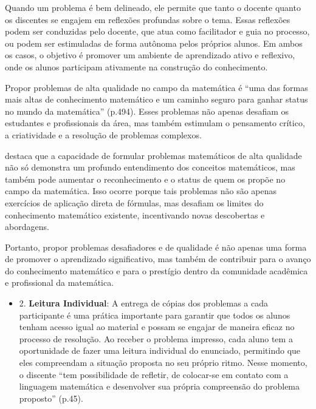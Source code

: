 Quando um problema é bem delineado, ele permite que tanto o docente quanto os discentes se engajem em reflexões profundas sobre o tema. Essas reflexões podem ser conduzidas pelo docente, que atua como facilitador e guia no processo, ou podem ser estimuladas de forma autônoma pelos próprios alunos. Em ambos os casos, o objetivo é promover um ambiente de aprendizado ativo e reflexivo, onde os alunos participam ativamente na construção do conhecimento.

Propor problemas de alta qualidade no campo da matemática é ``uma das formas mais altas de conhecimento matemático e um caminho seguro para ganhar
status no mundo da matemática'' \cite{CRESPO2015} (p.494). Esses problemas não apenas desafiam os estudantes e profissionais da área, mas também estimulam o pensamento crítico, a criatividade e a resolução de problemas complexos.

 destaca que a capacidade de formular problemas matemáticos de alta qualidade não só demonstra um profundo entendimento dos conceitos matemáticos, mas também pode aumentar o reconhecimento e o status de quem os propõe no campo da matemática. Isso ocorre porque tais problemas não são apenas exercícios de aplicação direta de fórmulas, mas desafiam os limites do conhecimento matemático existente, incentivando novas descobertas e abordagens.

Portanto, propor problemas desafiadores e de qualidade é não apenas uma forma de promover o aprendizado significativo, mas também de contribuir para o avanço do conhecimento matemático e para o prestígio dentro da comunidade acadêmica e profissional da matemática.


\begin{itemize}
    \item 2. \textbf{Leitura Individual}: A entrega de cópias dos problemas a cada participante é uma prática importante para garantir que todos os alunos tenham acesso igual ao material e possam se engajar de maneira eficaz no processo de resolução. Ao receber o problema impresso, cada aluno tem a oportunidade de fazer uma leitura individual do enunciado, permitindo que eles compreendam a situação proposta no seu próprio ritmo. Nesse momento, o discente ``tem possibilidade de refletir, de colocar-se em contato com a linguagem matemática e desenvolver sua própria compreensão do problema proposto'' \cite{OSHIMA2011} (p.45).
\end{itemize}

